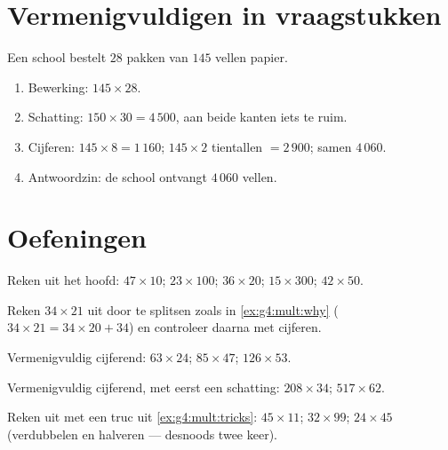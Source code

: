 \section{Vermenigvuldigen in vraagstukken}

\begin{example}\label{ex:g4:mult:problem}
Een school bestelt $28$ pakken van $145$ vellen papier.
\begin{enumerate}
  \item Bewerking: $145 \times 28$.
  \item Schatting: $150 \times 30 = 4\,500$, aan beide kanten iets te
        ruim.
  \item Cijferen: $145 \times 8 = 1\,160$; $145 \times 2$ tientallen
        $= 2\,900$; samen $4\,060$.
  \item Antwoordzin: de school ontvangt $4\,060$ vellen.
\end{enumerate}
\end{example}

\section{Oefeningen}

\begin{exercise}[$\star$]\label{exo:g4:mult:1}
Reken uit het hoofd: $47 \times 10$; \quad $23 \times 100$; \quad
$36 \times 20$; \quad $15 \times 300$; \quad $42 \times 50$.
\end{exercise}

\begin{exercise}[$\star$]\label{exo:g4:mult:2}
Reken $34 \times 21$ uit door te splitsen zoals in
\cref{ex:g4:mult:why} ($34 \times 21 = 34 \times 20 + 34$) en controleer
daarna met cijferen.
\end{exercise}

\begin{exercise}[$\star$]\label{exo:g4:mult:3}
Vermenigvuldig cijferend: $63 \times 24$; \quad $85 \times 47$; \quad
$126 \times 53$.
\end{exercise}

\begin{exercise}[$\star$]\label{exo:g4:mult:4}
Vermenigvuldig cijferend, met eerst een schatting: $208 \times 34$; \quad
$517 \times 62$.
\end{exercise}

\begin{exercise}[$\star$]\label{exo:g4:mult:5}
Reken uit met een truc uit \cref{ex:g4:mult:tricks}:
$45 \times 11$; \quad $32 \times 99$; \quad $24 \times 45$ (verdubbelen
en halveren --- desnoods twee keer).
\end{exercise}

